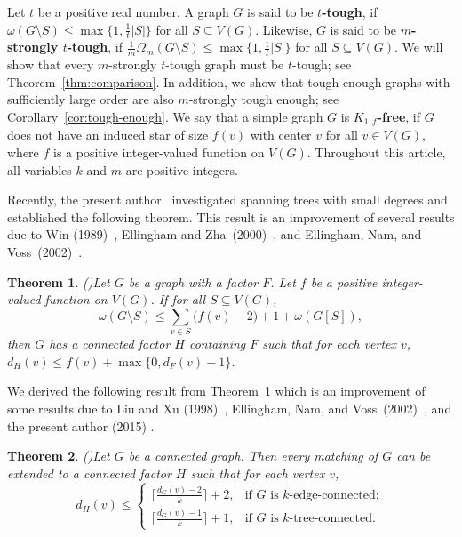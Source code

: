\documentclass[10pt,bezier]{article}
\newtheorem{prethm}{{\bf Theorem}}[section]
\newenvironment{thm}{\begin{prethm}{\hspace{-0.5
em}{\bf.}}}{\end{prethm}}
\begin{document}
%
%
%
Let $t$ be a positive real number.
A graph $G$ is said to be {\bf $t$-tough}, if $\omega(G\setminus S)\le \max\{1,\frac{1}{t}|S|\}$ for all $S\subseteq V(G)$. 
Likewise, $G$ is said to be {\bf $m$-strongly $t$-tough},
 if $\frac{1}{m}\Omega_m(G\setminus S)\le \max\{1,\frac{1}{t}|S|\}$ for all $S\subseteq V(G)$.
We will show that every $m$-strongly $t$-tough graph must be $t$-tough; see Theorem~\ref{thm:comparison}. 
In addition, we show that tough enough graphs with sufficiently large
order are also $m$-strongly tough enough; see Corollary~\ref{cor:tough-enough}.
We say that a simple graph $G$ is {\bf $K_{1,f}$-free}, if $G$ does not have an induced star of size $f(v)$ with center $v$ for all $v\in V(G)$, where $f$ is a positive integer-valued function on $V(G)$.
Throughout this article, all variables $k$ and $m$ are positive integers.
%
%			
%
%
%
%
%								

Recently, the present author~\cite{ ClosedWalks} investigated spanning trees with small degrees and established
the following theorem. This result is an improvement of several results due to Win (1989)~\cite{Win-1989}, Ellingham and Zha~(2000)~\cite{Ellingham-Zha-2000}, and Ellingham, Nam, and Voss~(2002)~\cite{Ellingham-Nam-Voss-2002}.
%
\begin{thm}{\rm(\cite{ClosedWalks})}\label{thm:c=2:G[S]}
{Let $G$ be a graph with a factor $F$. 
Let $f$ be a positive integer-valued function on $V(G)$. If for all $S\subseteq V(G)$, 
$$\omega(G\setminus S)\le \sum_{v\in S}\big(f(v)-2\big)+1+\omega(G[S]),$$ 
then $G$ has a connected factor $H$ containing $F$ such that for each vertex $v$,
$d_H(v)\le f(v)+\max\{0, d_F(v)-1\}$.
}\end{thm}

We derived the following result from Theorem~\ref{thm:c=2:G[S]} which is an improvement of some results due to 
Liu and Xu (1998)~\cite{MR1621287}, Ellingham, Nam, and Voss~(2002)~\cite{Ellingham-Nam-Voss-2002}, and the present author (2015) \cite{SpanningTreeEulerian-2015}.
%
\begin{thm}{\rm(\cite{ClosedWalks})}\label{intro:thm:edge-connected}
{Let $G$ be a connected graph. Then every matching of $G$ can be extended to a connected factor $H$ such that for each vertex $v$, 
$$d_H(v)\le 
 \begin{cases}
\lceil \frac{d_G(v)-2}{k}\rceil+2,	&\text{if $G$ is $k$-edge-connected};\\ 
\lceil \frac{d_G(v)-1}{k}\rceil+1,	&\text{if $G$ is $k$-tree-connected}.
\end {cases}$$
}\end{thm}
\end{document}
